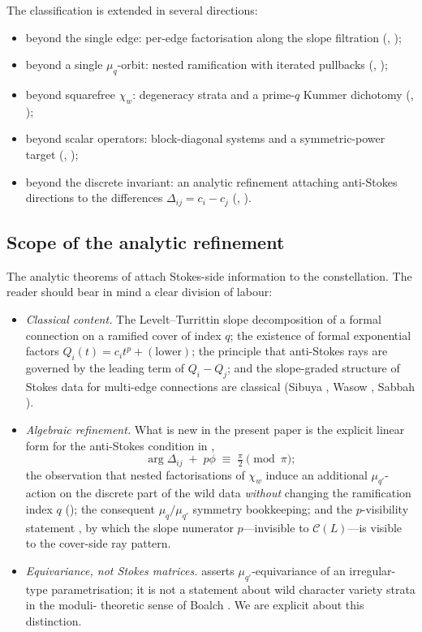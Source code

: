 \documentclass[11pt,a4paper]{article}
\theoremstyle{plain}
\theoremstyle{definition}
\theoremstyle{remark}
\newcommand{\Cl}{\mathcal{C}}
\newcommand{\Dij}{\Delta_{ij}}
\begin{document}
The classification is extended in several directions:
\begin{itemize}[leftmargin=*]
\item beyond the single edge: per-edge factorisation along the slope
      filtration (, );
\item beyond a single $\mu_q$-orbit: nested ramification with iterated
      pullbacks (, );
\item beyond squarefree $\chi_w$: degeneracy strata and a prime-$q$
      Kummer dichotomy (, );
\item beyond scalar operators: block-diagonal systems and a
      symmetric-power target (, );
\item beyond the discrete invariant: an analytic refinement attaching
      anti-Stokes directions to the differences $\Dij = c_i - c_j$
      (, ).
\end{itemize}

\subsection{Scope of the analytic refinement}
\label{ssec:intro-analytic-scope}

The analytic theorems of  attach Stokes-side
information to the constellation. The reader should bear in mind a
clear division of labour:
\begin{itemize}[leftmargin=2em]
\item \emph{Classical content.} The Levelt--Turrittin slope
decomposition of a formal connection on a ramified cover of index $q$;
the existence of formal exponential factors $Q_i(t) = c_i t^p +
(\text{lower})$; the principle that anti-Stokes rays are governed by
the leading term of $Q_i - Q_j$; and the slope-graded structure of
Stokes data for multi-edge connections are classical
(Sibuya \cite{sibuya}, Wasow \cite{wasow}, Sabbah
\cite{sabbah-polarizable}).
\item \emph{Algebraic refinement.} What is new in the present paper
is the explicit linear form for the anti-Stokes condition in
,
\[
   \arg \Dij \;+\; p\phi \;\equiv\; \tfrac{\pi}{2} \pmod \pi;
\]
the observation that nested factorisations of $\chi_w$ induce an
additional $\mu_{q'}$-action on the discrete part of the wild data
\emph{without} changing the ramification index $q$ ();
the consequent $\mu_q/\mu_{q'}$ symmetry bookkeeping; and the
$p$-visibility statement , by which the slope numerator
$p$---invisible to $\Cl(L)$---is visible to the cover-side ray pattern.
\item \emph{Equivariance, not Stokes matrices.}  asserts
$\mu_{q'}$-equivariance of an irregular-type parametrisation; it is
not a statement about wild character variety strata in the moduli-
theoretic sense of Boalch \cite{boalch-stokes,boalch-wildhodge}.
We are explicit about this distinction.
\end{itemize}
\end{document}
